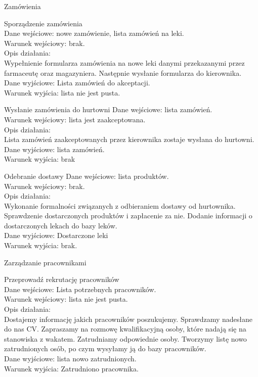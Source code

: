 \documentclass[a4paper, 11pt]{article}
\begin{document}
\begin{myEnumerate}
	
	\item Zamówienia
	\begin{myEnumerate}
		\item Sporządzenie zamówienia\\
	Dane wejściowe: nowe zamówienie, lista zamówień na leki.\\
	Warunek wejściowy: brak.\\
	Opis działania:\\
		Wypełnienie formularza zamówienia na nowe leki danymi przekazanymi przez farmaceutę oraz magazyniera. Następnie wysłanie formularza do kierownika.\\		
	Dane wyjściowe: Lista zamówień do akceptacji.\\
	Warunek wyjścia: lista nie jest pusta.\\
		\item Wysłanie zamówienia do hurtowni	
	Dane wejściowe: lista zamówień.\\
	Warunek wejściowy: lista jest zaakceptowana.\\
	Opis działania:\\
		Lista zamówień zaakceptowanych przez kierownika zostaje wysłana do hurtowni.\\		
	Dane wyjściowe: lista zamówień. \\
	Warunek wyjścia: brak\\
		\item  Odebranie dostawy
	Dane wejściowe: lista produktów.\\
	Warunek wejściowy: brak.\\
	Opis działania:\\
		Wykonanie formalności związanych z odbieraniem dostawy od hurtownika. Sprawdzenie dostarczonych produktów i zapłacenie za nie. Dodanie informacji o dostarczonych lekach do bazy leków. \\		
	Dane wyjściowe: Dostarczone leki\\
	Warunek wyjścia: brak.\\
	\end{myEnumerate}
	
	
	\item Zarządzanie pracownikami\\
	\begin{myEnumerate}
	\item  Przeprowadź rekrutację pracowników	\\
	Dane wejściowe: Lista potrzebnych pracowników.\\
	Warunek wejściowy: lista nie jest pusta.\\
	Opis działania:\\
		Dostajemy informację jakich pracowników poszukujemy. Sprawdzamy nadesłane do nas CV. Zapraszamy na rozmowę kwalifikacyjną osoby, które nadają się na stanowiska z wakatem. Zatrudniamy odpowiednie osoby. Tworzymy listę nowo zatrudnionych osób, po czym wysyłamy ją do bazy pracowników. \\		
	Dane wyjściowe: lista nowo zatrudnionych.\\
	Warunek wyjścia: Zatrudniono pracownika.\\
	

\end{myEnumerate}
\end{myEnumerate}
\end{document}
